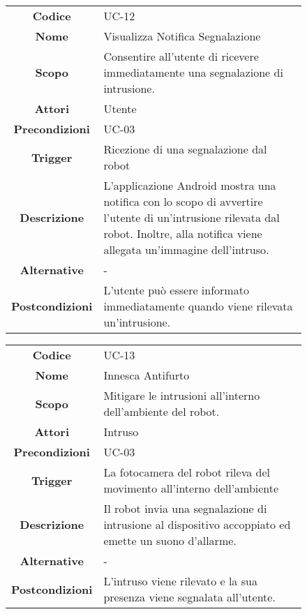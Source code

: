 \documentclass[]{article}
\begin{document}
\begin{figure}[htbp]
\centering
\begin{tabular}{|c|l|}
\hline

\textbf{Codice}
 & 
UC-12
\\

\textbf{Nome}
 & 
Visualizza Notifica Segnalazione
\\

\textbf{Scopo}
 & 
Consentire all'utente di ricevere immediatamente una segnalazione di
intrusione.
\\

\textbf{Attori}
 & 
Utente
\\

\textbf{Precondizioni}
 & 
UC-03
\\

\textbf{Trigger}
 & 
Ricezione di una segnalazione dal robot
\\

\textbf{Descrizione}
 & 
L'applicazione Android mostra una notifica con lo scopo di avvertire
l'utente di un'intrusione rilevata dal robot. Inoltre, alla notifica
viene allegata un'immagine dell'intruso.
\\

\textbf{Alternative}
 & 
-
\\

\textbf{Postcondizioni}
 & 
L'utente può essere informato immediatamente quando viene rilevata
un'intrusione.
\\
\hline
\end{tabular}
\end{figure}

\begin{figure}[htbp]
\centering
\begin{tabular}{|c|l|}
\hline

\textbf{Codice}
 & 
UC-13
\\

\textbf{Nome}
 & 
Innesca Antifurto
\\

\textbf{Scopo}
 & 
Mitigare le intrusioni all'interno dell'ambiente del robot.
\\

\textbf{Attori}
 & 
Intruso
\\

\textbf{Precondizioni}
 & 
UC-03
\\

\textbf{Trigger}
 & 
La fotocamera del robot rileva del movimento all'interno
dell'ambiente
\\

\textbf{Descrizione}
 & 
Il robot invia una segnalazione di intrusione al dispositivo accoppiato
ed emette un suono d'allarme.
\\

\textbf{Alternative}
 & 
-
\\

\textbf{Postcondizioni}
 & 
L'intruso viene rilevato e la sua presenza viene segnalata
all'utente.
\\
\hline
\end{tabular}
\end{figure}
\end{document}
